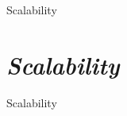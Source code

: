 
                 {Scalability}
\chapter{\textit{Scalability}}
\label{cap:scalability}
                 {Scalability}






